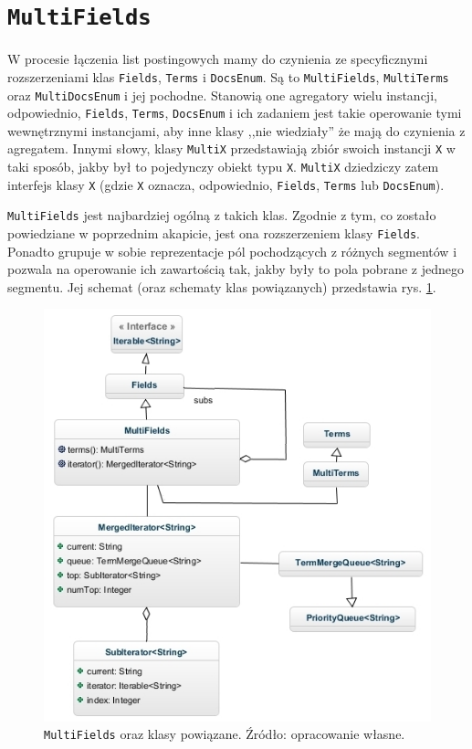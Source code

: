 \section{\texttt{MultiFields}}

W procesie łączenia list postingowych mamy do czynienia ze specyficznymi rozszerzeniami klas \texttt{Fields}, \texttt{Terms} i \texttt{DocsEnum}. Są to \texttt{MultiFields}, \texttt{MultiTerms} oraz \texttt{MultiDocsEnum} i jej pochodne. Stanowią one agregatory wielu instancji, odpowiednio, \texttt{Fields}, \texttt{Terms}, \texttt{DocsEnum} i ich zadaniem jest takie operowanie tymi wewnętrznymi instancjami, aby inne klasy ,,nie wiedziały'' że mają do czynienia z agregatem. Innymi słowy, klasy \texttt{MultiX} przedstawiają zbiór swoich instancji \texttt{X} w taki sposób, jakby był to pojedynczy obiekt typu \texttt{X}. \texttt{MultiX} dziedziczy zatem interfejs klasy \texttt{X} (gdzie \texttt{X} oznacza, odpowiednio, \texttt{Fields}, \texttt{Terms} lub \texttt{DocsEnum}).

\texttt{MultiFields} jest najbardziej ogólną z takich klas. Zgodnie z tym, co zostało powiedziane w poprzednim akapicie, jest ona rozszerzeniem klasy \texttt{Fields}. Ponadto grupuje w sobie reprezentacje pól pochodzących z różnych segmentów i pozwala na operowanie ich zawartością tak, jakby były to pola pobrane z jednego segmentu. Jej schemat (oraz schematy klas powiązanych) przedstawia rys. \ref{multiFields}.

\begin{figure}[here]
 \includegraphics[scale=0.65]{pictures/MultiFields_2.jpg}
 \caption{\texttt{MultiFields} oraz klasy powiązane. Źródło: opracowanie własne.\label{multiFields}}
\end{figure}

